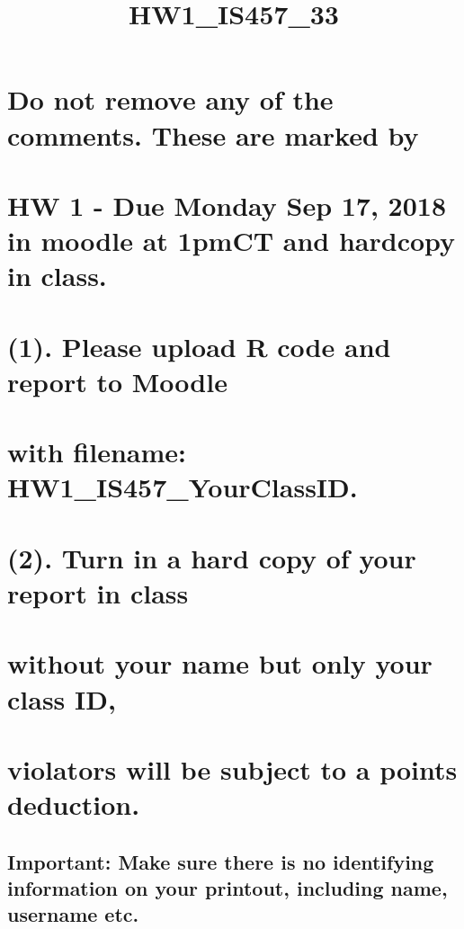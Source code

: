 \documentclass[]{article}
\title{HW1\_IS457\_33}
\author{}
\date{}
\begin{document}
\maketitle

\section{Do not remove any of the comments. These are marked
by}\label{do-not-remove-any-of-the-comments.-these-are-marked-by}

\section{HW 1 - Due Monday Sep 17, 2018 in moodle at 1pmCT and hardcopy
in
class.}\label{hw-1---due-monday-sep-17-2018-in-moodle-at-1pmct-and-hardcopy-in-class.}

\section{(1). Please upload R code and report to
Moodle}\label{please-upload-r-code-and-report-to-moodle}

\section{with filename:
HW1\_IS457\_YourClassID.}\label{with-filename-hw1_is457_yourclassid.}

\section{(2). Turn in a hard copy of your report in
class}\label{turn-in-a-hard-copy-of-your-report-in-class}

\section{without your name but only your class
ID,}\label{without-your-name-but-only-your-class-id}

\section{violators will be subject to a points
deduction.}\label{violators-will-be-subject-to-a-points-deduction.}

\subsection{Important: Make sure there is no identifying information on
your printout, including name, username
etc.}\label{important-make-sure-there-is-no-identifying-information-on-your-printout-including-name-username-etc.}
\end{document}

